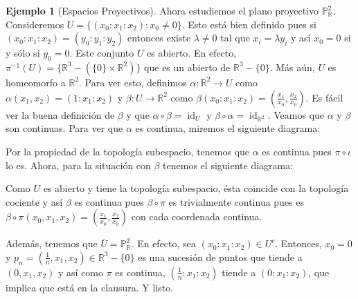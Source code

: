\documentclass[12pt]{book}
\theoremstyle{definition}
\newtheorem{ex}[teo]{Ejemplo}
\newcommand{\RR}{\mathbb{R}}      %
\DeclareMathOperator{\id}{id}
\begin{document}
\begin{ex}[Espacios Proyectivos]
Ahora estudiemos el plano proyectivo $\mathbb{P}^2_\RR$. Consideremos $U=\{(x_0:x_1:x_2) : x_0\neq 0\}$. Esto está bien definido pues si $(x_0:x_1:x_2) = (y_0:y_1:y_2)$ entonces existe $\lambda\neq 0$ tal que $x_i = \lambda y_i$ y así $x_0=0$ si y sólo si $y_0=0$. Este conjunto $U$ es abierto. En efecto, $\pi^{-1}(U) = \{\RR^3 - (\{0\}\times\RR^2)\}$ que es un abierto de $\RR^3 - \{0\}$. Más aún, $U$ es homeomorfo a $\RR^2$. Para ver esto, definimos $\alpha:\RR^2\to U$ como $\alpha(x_1,x_2) = (1:x_1:x_2)$ y $\beta:U\to\RR^2$ como $\beta(x_0:x_1:x_2) = (\frac{x_1}{x_0},\frac{x_2}{x_0})$. Es fácil ver la buena definición de $\beta$ y que $\alpha\circ\beta = \id_U$ y $\beta\circ\alpha=\id_{\RR^2}$. Veamos que $\alpha$ y $\beta$ son continuas. Para ver que $\alpha$ es continua, miremos el siguiente diagrama:

\begin{center}
\end{center}

Por la propiedad de la topología subespacio, tenemos que $\alpha$ es continua pues $\pi\circ\iota$ lo es. Ahora, para la situación con $\beta$ tenemos el siguiente diagrama:

\begin{center}
\end{center}
Como $U$ es abierto y tiene la topología subespacio, ésta coincide con la topología cociente y así $\beta$ es continua pues $\beta\circ\pi$ es trivialmente continua pues es $\beta\circ\pi(x_0,x_1,x_2) = (\frac{x_1}{x_0},\frac{x_2}{x_0})$ con cada coordenada continua.

Además, tenemos que $\overline{U} =\mathbb{P}^2_\RR$. En efecto, sea $(x_0:x_1:x_2)\in U^c$. Entonces, $x_0=0$ y $p_n = (\frac{1}{n},x_1,x_2)\in\RR^3 - \{0\}$ es una sucesión de puntos que tiende a $(0,x_1,x_2)$ y así como $\pi$ es continua, $(\frac{1}{n}:x_1:x_2)$ tiende a $(0:x_1:x_2)$, que implica que está en la clausura. Y listo.


\end{ex}
\end{document}
